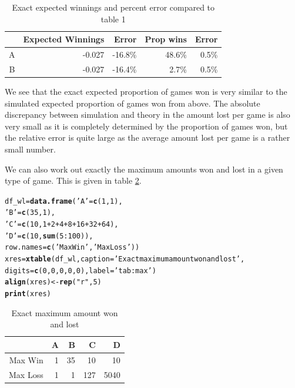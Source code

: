 \documentclass[12pt]{article}\usepackage[]{graphicx}\usepackage[]{color}
\makeatletter
\newcommand{\hlnum}[1]{\textcolor[rgb]{0.686,0.059,0.569}{#1}}%
\newcommand{\hlstr}[1]{\textcolor[rgb]{0.192,0.494,0.8}{#1}}%
\newcommand{\hlopt}[1]{\textcolor[rgb]{0,0,0}{#1}}%
\newcommand{\hlstd}[1]{\textcolor[rgb]{0.345,0.345,0.345}{#1}}%
\newcommand{\hlkwb}[1]{\textcolor[rgb]{0.69,0.353,0.396}{#1}}%
\newcommand{\hlkwc}[1]{\textcolor[rgb]{0.333,0.667,0.333}{#1}}%
\newcommand{\hlkwd}[1]{\textcolor[rgb]{0.737,0.353,0.396}{\textbf{#1}}}%
\newenvironment{kframe}{%
 \def\at@end@of@kframe{}%
 \ifinner\ifhmode%
  \def\at@end@of@kframe{\end{minipage}}%
  \begin{minipage}{\columnwidth}%
 \fi\fi%
 \def\FrameCommand##1{\hskip\@totalleftmargin \hskip-\fboxsep
 \colorbox{shadecolor}{##1}\hskip-\fboxsep
     \hskip-\linewidth \hskip-\@totalleftmargin \hskip\columnwidth}%
 \MakeFramed {\advance\hsize-\width
   \@totalleftmargin\z@ \linewidth\hsize
   \@setminipage}}%
 {\par\unskip\endMakeFramed%
 \at@end@of@kframe}
\makeatother
\begin{document}
\begin{table}[ht]
\centering
\begin{tabular}{rrrrr}
  \hline
   & Expected Winnings & Error & Prop wins & Error \\
 \hline
A & -0.027 & -16.8\% & 48.6\% & 0.5\% \\ 
  B & -0.027 & -16.4\% & 2.7\% & 0.5\% \\ 
   \hline
\end{tabular}
\caption{Exact expected winnings and percent error compared
              to table 1} 
\label{tab:ex}
\end{table}


We see that the exact expected proportion of games won is very similar to the simulated expected proportion of games won from above. The absolute discrepancy between simulation and theory in the amount lost per game is also very small as it is completely determined by the proportion of games won, but the relative error is quite large as the average amount lost per game is a rather small number.

We can also work out exactly the maximum amounts won and lost in a given type of game. This is given in table \ref{tab:max}.

\begin{kframe}
\begin{alltt}
\hlstd{df_wl} \hlkwb{=} \hlkwd{data.frame}\hlstd{(}\hlstr{'A'} \hlstd{=} \hlkwd{c}\hlstd{(}\hlnum{1}\hlstd{,}\hlnum{1}\hlstd{),}
                   \hlstr{'B'} \hlstd{=} \hlkwd{c}\hlstd{(}\hlnum{35}\hlstd{,}\hlnum{1}\hlstd{),}
                    \hlstr{'C'} \hlstd{=} \hlkwd{c}\hlstd{(}\hlnum{10}\hlstd{,} \hlnum{1}\hlopt{+}\hlnum{2}\hlopt{+}\hlnum{4}\hlopt{+}\hlnum{8}\hlopt{+}\hlnum{16}\hlopt{+}\hlnum{32}\hlopt{+}\hlnum{64}\hlstd{),}
                   \hlstr{'D'} \hlstd{=} \hlkwd{c}\hlstd{(}\hlnum{10}\hlstd{,} \hlkwd{sum}\hlstd{(}\hlnum{5}\hlopt{:}\hlnum{100}\hlstd{)),}
                   \hlkwc{row.names} \hlstd{=} \hlkwd{c}\hlstd{(}\hlstr{'Max Win'}\hlstd{,} \hlstr{'Max Loss'}\hlstd{))}
\hlstd{xres} \hlkwb{=} \hlkwd{xtable}\hlstd{(df_wl,} \hlkwc{caption} \hlstd{=} \hlstr{'Exact maximum amount won and lost'}\hlstd{,}
              \hlkwc{digits} \hlstd{=} \hlkwd{c}\hlstd{(}\hlnum{0}\hlstd{,}\hlnum{0}\hlstd{,}\hlnum{0}\hlstd{,}\hlnum{0}\hlstd{,}\hlnum{0}\hlstd{),} \hlkwc{label}\hlstd{=}\hlstr{'tab:max'}\hlstd{)}
\hlkwd{align}\hlstd{(xres)} \hlkwb{<-} \hlkwd{rep}\hlstd{(}\hlstr{"r"}\hlstd{,} \hlnum{5}\hlstd{)}
\hlkwd{print}\hlstd{(xres)}
\end{alltt}
\end{kframe}%
\begin{table}[ht]
\centering
\begin{tabular}{rrrrr}
  \hline
 & A & B & C & D \\ 
  \hline
Max Win & 1 & 35 & 10 & 10 \\ 
  Max Loss & 1 & 1 & 127 & 5040 \\ 
   \hline
\end{tabular}
\caption{Exact maximum amount won and lost} 
\label{tab:max}
\end{table}
\end{document}
